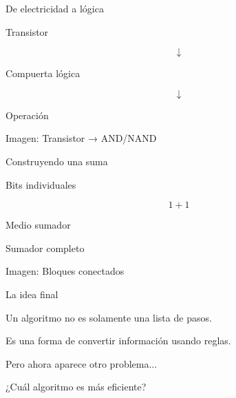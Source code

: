 \documentclass{beamer}
\begin{document}

\begin{frame}{De electricidad a lógica}

Transistor

\[
\downarrow
\]

Compuerta lógica

\[
\downarrow
\]

Operación

\vspace{1cm}

Imagen:
Transistor → AND/NAND

\end{frame}



\begin{frame}{Construyendo una suma}

\begin{center}

Bits individuales

\[
1+1
\]

\pause

Medio sumador

\pause

Sumador completo

\end{center}

Imagen:
Bloques conectados

\end{frame}



\begin{frame}{La idea final}

Un algoritmo no es solamente una lista de pasos.

\vspace{0.5cm}

Es una forma de convertir información usando reglas.

\pause

Pero ahora aparece otro problema...

\vspace{0.5cm}

¿Cuál algoritmo es más eficiente?

\end{frame}
\end{document}
